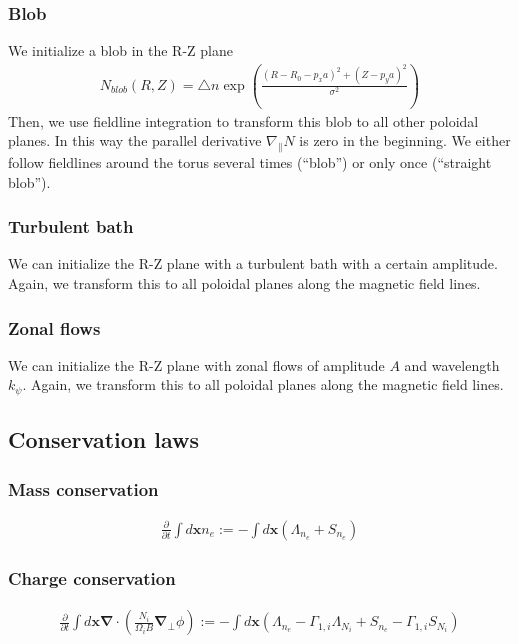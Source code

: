 \documentclass{hitec} %
\renewcommand{\vec}[1]{\boldsymbol{#1}}
\begin{document}
\subsubsection{Blob}
We initialize a blob in the R-Z plane
\begin{align}
  N_{blob}(R,Z) = \triangle n \exp\left( \frac{(R - R_0 - p_x a)^2 + (Z-p_ya)^2}{\sigma^2} \right)
  \label{}
\end{align}
Then, we use fieldline integration to transform this blob to all other poloidal planes. In this way the parallel derivative $\nabla_\parallel N$ is zero in the beginning.
We either follow fieldlines around the torus several times (``blob'') or only once
(``straight blob'').
\subsubsection{Turbulent bath}
We can initialize the R-Z plane with a turbulent bath with a certain amplitude.
Again, we transform this to all poloidal planes along the magnetic field lines.
\subsubsection{Zonal flows}
We can initialize the R-Z plane with zonal flows of amplitude $A$ and wavelength $k_\psi$.
Again, we transform this to all poloidal planes along the magnetic field lines.

\subsection{Conservation laws}
\subsubsection{Mass conservation}
\begin{align}
  \frac{\partial}{\partial t} \int d\vec{x} n_e :=  - \int d\vec{x} (\Lambda_{n_e}+S_{n_e})
\end{align}
\subsubsection{Charge conservation}
\begin{align}
  \frac{\partial}{\partial t} \int d\vec{x} \vec{\nabla} \cdot\left(\frac{N_i}{\Omega_i B} \vec{\nabla}_\perp \phi\right) :=  - \int d\vec{x} (\Lambda_{n_e} - \Gamma_{1,i}\Lambda_{N_i} + S_{n_e} - \Gamma_{1,i}S_{N_i})
\end{align}
\end{document}
